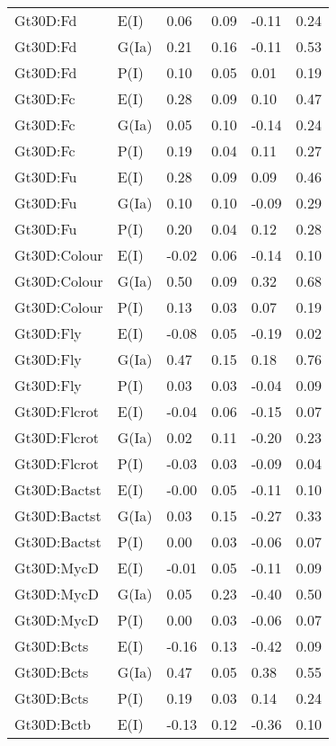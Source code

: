 \begin{center}
\begin{longtable}{|p{1.1in}|p{0.7in}|p{0.7in}|p{0.6in}|p{0.6in}|p{0.6in}|}
  Gt30D:Fd & E(I) & 0.06 & 0.09 & -0.11 & 0.24 \\ 
  Gt30D:Fd & G(Ia) & 0.21 & 0.16 & -0.11 & 0.53 \\ 
  Gt30D:Fd & P(I) & 0.10 & 0.05 & 0.01 & 0.19 \\ 
  Gt30D:Fc & E(I) & 0.28 & 0.09 & 0.10 & 0.47 \\ 
  Gt30D:Fc & G(Ia) & 0.05 & 0.10 & -0.14 & 0.24 \\ 
  Gt30D:Fc & P(I) & 0.19 & 0.04 & 0.11 & 0.27 \\ 
  Gt30D:Fu & E(I) & 0.28 & 0.09 & 0.09 & 0.46 \\ 
  Gt30D:Fu & G(Ia) & 0.10 & 0.10 & -0.09 & 0.29 \\ 
  Gt30D:Fu & P(I) & 0.20 & 0.04 & 0.12 & 0.28 \\ 
  Gt30D:Colour & E(I) & -0.02 & 0.06 & -0.14 & 0.10 \\ 
  Gt30D:Colour & G(Ia) & 0.50 & 0.09 & 0.32 & 0.68 \\ 
  Gt30D:Colour & P(I) & 0.13 & 0.03 & 0.07 & 0.19 \\ 
  Gt30D:Fly & E(I) & -0.08 & 0.05 & -0.19 & 0.02 \\ 
  Gt30D:Fly & G(Ia) & 0.47 & 0.15 & 0.18 & 0.76 \\ 
  Gt30D:Fly & P(I) & 0.03 & 0.03 & -0.04 & 0.09 \\ 
  Gt30D:Flcrot & E(I) & -0.04 & 0.06 & -0.15 & 0.07 \\ 
  Gt30D:Flcrot & G(Ia) & 0.02 & 0.11 & -0.20 & 0.23 \\ 
  Gt30D:Flcrot & P(I) & -0.03 & 0.03 & -0.09 & 0.04 \\ 
  Gt30D:Bactst & E(I) & -0.00 & 0.05 & -0.11 & 0.10 \\ 
  Gt30D:Bactst & G(Ia) & 0.03 & 0.15 & -0.27 & 0.33 \\ 
  Gt30D:Bactst & P(I) & 0.00 & 0.03 & -0.06 & 0.07 \\ 
  Gt30D:MycD & E(I) & -0.01 & 0.05 & -0.11 & 0.09 \\ 
  Gt30D:MycD & G(Ia) & 0.05 & 0.23 & -0.40 & 0.50 \\ 
  Gt30D:MycD & P(I) & 0.00 & 0.03 & -0.06 & 0.07 \\ 
  Gt30D:Bcts & E(I) & -0.16 & 0.13 & -0.42 & 0.09 \\ 
  Gt30D:Bcts & G(Ia) & 0.47 & 0.05 & 0.38 & 0.55 \\ 
  Gt30D:Bcts & P(I) & 0.19 & 0.03 & 0.14 & 0.24 \\ 
  Gt30D:Bctb & E(I) & -0.13 & 0.12 & -0.36 & 0.10 \\ 

\end{longtable}
\end{center}
